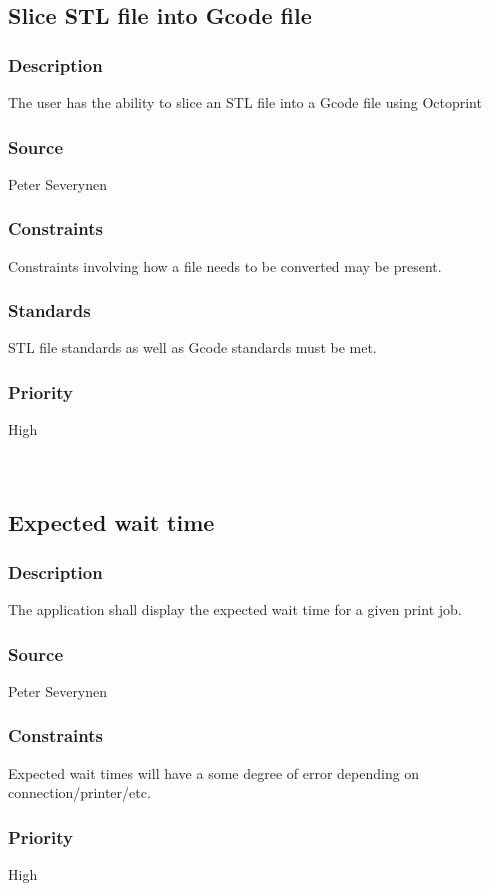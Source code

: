 \subsection{Slice STL file into Gcode file}
\subsubsection{Description}
The user has the ability to slice an STL file into a Gcode file using Octoprint
\subsubsection{Source}
Peter Severynen
\subsubsection{Constraints}
Constraints involving how a file needs to be converted may be present.
\subsubsection{Standards}
STL file standards as well as Gcode standards must be met.
\subsubsection{Priority}
High\\
\\
\\
\subsection{Expected wait time}
\subsubsection{Description}
The application shall display the expected wait time for a given print job.
\subsubsection{Source}
Peter Severynen
\subsubsection{Constraints}
Expected wait times will have a some degree of error depending on connection/printer/etc.
\subsubsection{Priority}
High\\
\\
\\
